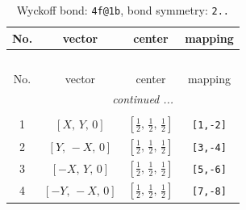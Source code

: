 \documentclass[fleqn,8pt]{jsarticle}
\begin{document}
\renewcommand{\arraystretch}{1.2}
\begin{longtable}{cccc}
\caption{Wyckoff bond: {\tt 4f@1b}, bond symmetry: {\tt 2..}}
 \\
 \hline \hline
No. & vector & center & mapping \\ \hline \endfirsthead

\multicolumn{3}{l}{\tablename\ \thetable{}} \\
 \hline \hline
No. & vector & center & mapping \\ \hline \endhead

 \hline \hline
\multicolumn{3}{r}{\footnotesize\it continued ...} \\ \endfoot

 \hline \hline
\multicolumn{3}{r}{} \\ \endlastfoot

1 & $\left[ X,\, Y,\, 0 \right]$ & $\left[ \frac{1}{2},\, \frac{1}{2},\, \frac{1}{2} \right]$ & {\tt [1,-2]} \\ \hline
2 & $\left[ Y,\, - X,\, 0 \right]$ & $\left[ \frac{1}{2},\, \frac{1}{2},\, \frac{1}{2} \right]$ & {\tt [3,-4]} \\ \hline
3 & $\left[ - X,\, Y,\, 0 \right]$ & $\left[ \frac{1}{2},\, \frac{1}{2},\, \frac{1}{2} \right]$ & {\tt [5,-6]} \\ \hline
4 & $\left[ - Y,\, - X,\, 0 \right]$ & $\left[ \frac{1}{2},\, \frac{1}{2},\, \frac{1}{2} \right]$ & {\tt [7,-8]} \\
\end{longtable}
\renewcommand{\arraystretch}{1.2}
\end{document}
